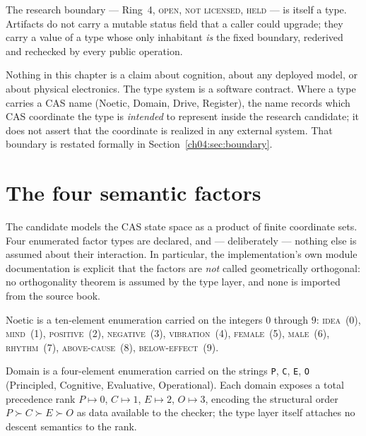 \begin{ruleenv}\label{ch04:rule:boundary}
The research boundary --- Ring~4, \textsc{open}, \textsc{not licensed},
\textsc{held} --- is itself a type. Artifacts do not carry a mutable status
field that a caller could upgrade; they carry a value of a type whose only
inhabitant \emph{is} the fixed boundary, rederived and rechecked by every
public operation.
\end{ruleenv}

Nothing in this chapter is a claim about cognition, about any deployed
model, or about physical electronics. The type system is a software
contract. Where a type carries a CAS name (Noetic, Domain, Drive,
Register), the name records which CAS coordinate the type is \emph{intended}
to represent inside the research candidate; it does not assert that the
coordinate is realized in any external system. That boundary is restated
formally in Section~\ref{ch04:sec:boundary}.

\section{The four semantic factors}\label{ch04:sec:factors}

The candidate models the CAS state space as a product of finite coordinate
sets. Four enumerated factor types are declared, and --- deliberately ---
nothing else is assumed about their interaction. In particular, the
implementation's own module documentation is explicit that the factors are
\emph{not} called geometrically orthogonal: no orthogonality theorem is
assumed by the type layer, and none is imported from the source book.

\begin{definition}\label{ch04:def:noetic}
$\mathrm{Noetic}$ is a ten-element enumeration carried on the integers
$0$ through $9$: \textsc{idea}~(0), \textsc{mind}~(1),
\textsc{positive}~(2), \textsc{negative}~(3), \textsc{vibration}~(4),
\textsc{female}~(5), \textsc{male}~(6), \textsc{rhythm}~(7),
\textsc{above-cause}~(8), \textsc{below-effect}~(9).
\end{definition}

\begin{definition}\label{ch04:def:domain}
$\mathrm{Domain}$ is a four-element enumeration carried on the strings
\texttt{P}, \texttt{C}, \texttt{E}, \texttt{O} (Principled, Cognitive,
Evaluative, Operational). Each domain exposes a total precedence rank
$P \mapsto 0$, $C \mapsto 1$, $E \mapsto 2$, $O \mapsto 3$, encoding the
structural order $P \succ C \succ E \succ O$ as data available to the
checker; the type layer itself attaches no descent semantics to the rank.
\end{definition}


